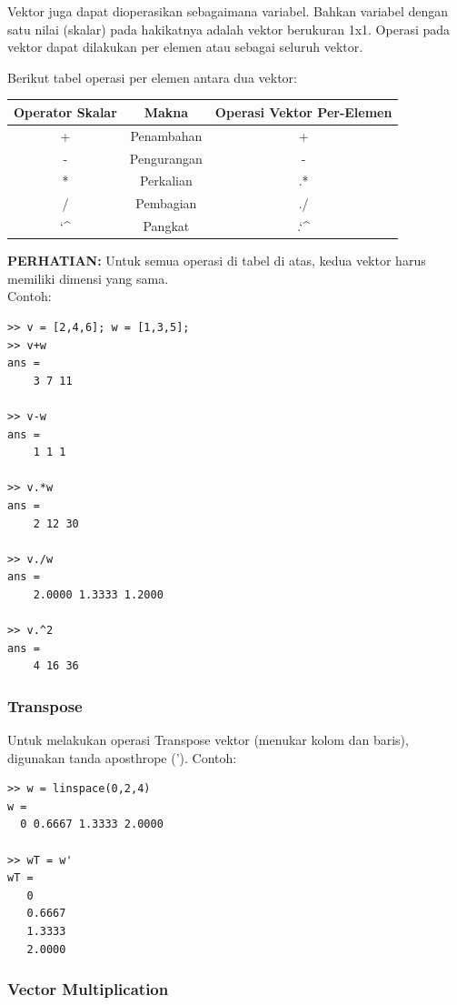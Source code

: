 \documentclass[12pt]{book}
\begin{document}
	Vektor juga dapat dioperasikan sebagaimana variabel.
	Bahkan variabel dengan satu nilai (skalar) pada hakikatnya adalah vektor berukuran 1x1.
	Operasi pada vektor dapat dilakukan per elemen atau sebagai seluruh vektor.
	
	Berikut tabel operasi per elemen antara dua vektor:
	\begin{center}
		\begin{tabular}{|c|c|c|}
			\hline
			Operator Skalar & Makna & Operasi Vektor Per-Elemen\\
			\hline\hline
			+ & Penambahan & +  \\
			\hline
			- & Pengurangan & - \\
			\hline
			* & Perkalian & .* \\
			\hline
			/ & Pembagian & ./ \\
			\hline
			\char`\^ & Pangkat & .\char`\^   \\
			\hline
		\end{tabular}
	\end{center}

	\textbf{PERHATIAN:} Untuk semua operasi di tabel di atas, kedua vektor harus memiliki dimensi yang sama.\\
	
	Contoh:
	\begin{verbatim}
>> v = [2,4,6]; w = [1,3,5];
>> v+w
ans =
    3 7 11
    
>> v-w
ans =
    1 1 1
    
>> v.*w
ans =
    2 12 30
    
>> v./w
ans =
    2.0000 1.3333 1.2000
    
>> v.^2
ans =
    4 16 36
	\end{verbatim}

	\subsubsection{Transpose}
	
	Untuk melakukan operasi Transpose vektor (menukar kolom dan baris), digunakan tanda aposthrope (').
	Contoh:
	\begin{verbatim}
>> w = linspace(0,2,4)
w =
  0 0.6667 1.3333 2.0000

>> wT = w'
wT = 
   0
   0.6667
   1.3333
   2.0000
	\end{verbatim}

	\newpage
	\subsubsection{Vector Multiplication}
	
\end{document}
